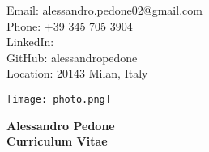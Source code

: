 \documentclass[10pt,a4paper]{article}
\begin{document}
\begin{minipage}[c]{0.65\textwidth}
    Email: alessandro.pedone02@gmail.com \\
    Phone: +39 345 705 3904 \\
    LinkedIn: \href{https://linkedin.com/in/alessandro-pedone-58288a368/}{\faLink} \\
    GitHub: alessandropedone \href{https://github.com/alessandropedone}{\faLink} \\
    Location: 20143 Milan, Italy \\

\end{minipage}
\hfill
\begin{minipage}[c]{0.3\textwidth}
    \raggedleft
    \texttt{[image: photo.png]}
\end{minipage}

\vspace{12pt}
\begin{center}
    {\LARGE\bfseries Alessandro Pedone} \\
    \vspace{1em}
    {\LARGE\bfseries Curriculum Vitae} \\
\end{center}

\vspace{12pt}
\end{document}
